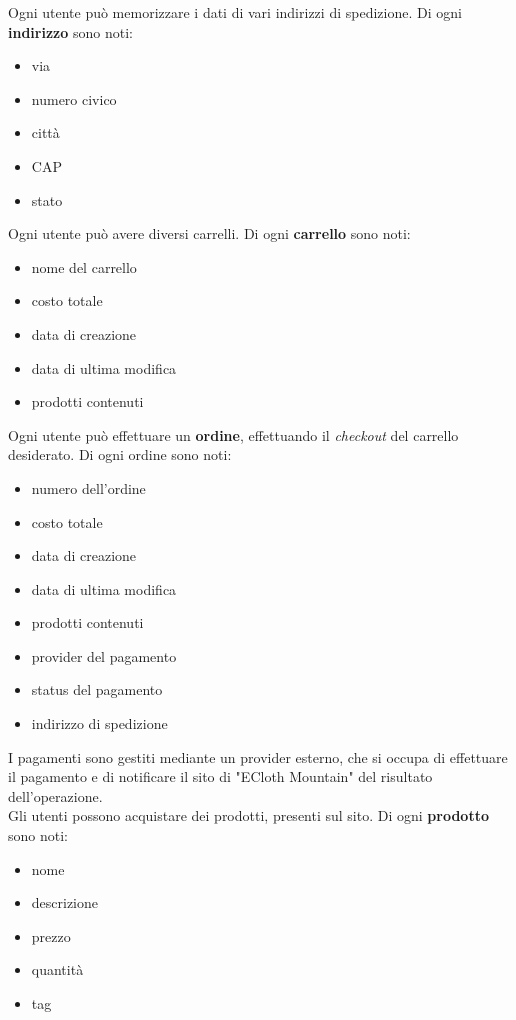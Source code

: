 \documentclass[11pt]{article}
\begin{document}
Ogni utente può memorizzare i dati di vari indirizzi di spedizione. Di ogni
\textbf{indirizzo} sono noti:

\begin{itemize}
	\item via
	\item numero civico
	\item città
	\item CAP
	\item stato
\end{itemize}

Ogni utente può avere diversi carrelli. Di ogni \textbf{carrello} sono noti:

\begin{itemize}
	\item nome del carrello
	\item costo totale
	\item data di creazione
	\item data di ultima modifica
	\item prodotti contenuti
\end{itemize}

Ogni utente può effettuare un \textbf{ordine}, effettuando il \textit{checkout}
del carrello desiderato. Di ogni ordine sono noti:

\begin{itemize}
	\item numero dell'ordine
	\item costo totale
	\item data di creazione
	\item data di ultima modifica
	\item prodotti contenuti
	\item provider del pagamento
	\item status del pagamento
	\item indirizzo di spedizione
\end{itemize}

I pagamenti sono gestiti mediante un provider esterno, che si occupa di
effettuare il pagamento e di notificare il sito di "ECloth Mountain" del
risultato dell'operazione. \\
Gli utenti possono acquistare dei prodotti, presenti sul sito. Di ogni
\textbf{prodotto} sono noti:

\begin{itemize}
	\item nome
	\item descrizione
	\item prezzo
	\item quantità
	\item tag
\end{itemize}
\end{document}
